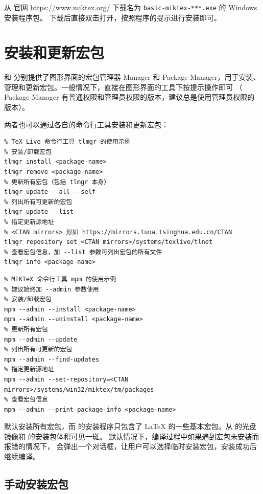 \subsubsection{}
从  官网 \url{https://www.miktex.org/} 下载名为 \texttt{basic-miktex-***.exe} 的 Windows 安装程序包。
下载后直接双击打开，按照程序的提示进行安装即可。

\section{安装和更新宏包}\label{sec:pkg-manager}

 和  分别提供了图形界面的宏包管理器  Manager 和
 Package Manager，用于安装、管理和更新宏包。一般情况下，直接在图形界面的工具下按提示操作即可
（ Package Manager 有普通权限和管理员权限的版本，建议总是使用管理员权限的版本）。

两者也可以通过各自的命令行工具安装和更新宏包：
\begin{verbatim}
% TeX Live 命令行工具 tlmgr 的使用示例
% 安装/卸载宏包
tlmgr install <package-name>
tlmgr remove <package-name>
% 更新所有宏包（包括 tlmgr 本身）
tlmgr update --all --self
% 列出所有可更新的宏包
tlmgr update --list
% 指定更新源地址
% <CTAN mirrors> 形如 https://mirrors.tuna.tsinghua.edu.cn/CTAN
tlmgr repository set <CTAN mirrors>/systems/texlive/tlnet
% 查看宏包信息，加 --list 参数可列出宏包的所有文件
tlmgr info <package-name>
\end{verbatim}

\begin{verbatim}
% MiKTeX 命令行工具 mpm 的使用示例
% 建议始终加 --admin 参数使用
% 安装/卸载宏包
mpm --admin --install <package-name>
mpm --admin --uninstall <package-name>
% 更新所有宏包
mpm --admin --update
% 列出所有可更新的宏包
mpm --admin --find-updates
% 指定更新源地址
mpm --admin --set-repository=<CTAN mirrors>/systems/win32/miktex/tm/packages
% 查看宏包信息
mpm --admin --print-package-info <package-name>
\end{verbatim}

 默认安装所有宏包，而  的安装程序只包含了 \LaTeX{} 的一些基本宏包。从  的光盘镜像和  的安装包体积可见一斑。
默认情况下，编译过程中如果遇到宏包未安装而报错的情况下， 会弹出一个对话框，让用户可以选择临时安装宏包，安装成功后继续编译。

\subsection{手动安装宏包}\label{subsec:pkg-manual-install}

